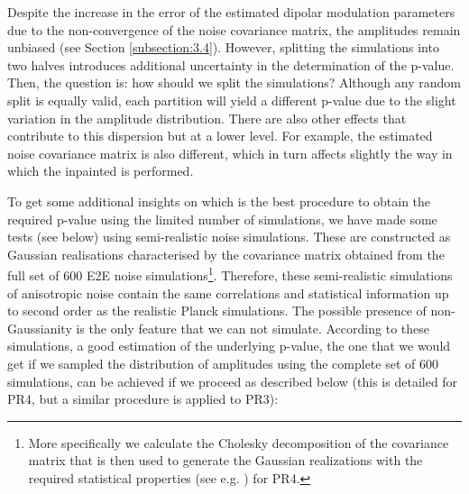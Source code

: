 Despite the increase in the error of the estimated dipolar modulation parameters due to the non-convergence of the noise covariance matrix, the amplitudes remain unbiased (see Section \ref{subsection:3.4}). However, splitting the simulations into two halves introduces additional uncertainty in the determination of the p-value. Then, the question is: how should we split the simulations? Although any random split is equally valid, each partition will yield a different p-value due to the slight variation in the amplitude distribution. There are also other effects that contribute to this dispersion but at a lower level. For example, the estimated noise covariance matrix is also different, which in turn affects slightly the way in which the inpainted is performed.

To get some additional insights on which is the best procedure to obtain the required p-value using the limited number of simulations, we have made some tests (see below) using semi-realistic noise simulations. These are constructed as Gaussian realisations characterised by the covariance matrix obtained from the full set of 600 E2E noise simulations\footnote{More specifically we calculate the Cholesky decomposition of the covariance matrix that is then used to generate the Gaussian realizations with the required statistical properties (see e.g. \cite{bar08}) for PR4.}. 
Therefore, these semi-realistic simulations of anisotropic noise contain the same correlations and statistical information up to second order as the realistic Planck simulations. The possible presence of non-Gaussianity is the only feature that we can not simulate. According to these simulations, a good estimation of the underlying p-value, the one that we would get if we sampled the distribution of amplitudes using the complete set of 600 simulations, can be achieved if we proceed as described below (this is detailed for PR4, but a similar procedure is applied to PR3):

